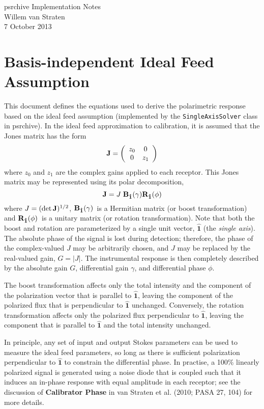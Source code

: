\documentclass[12pt]{article}
\newcommand{\boost}[1][1]{{\ensuremath{ {\bf B}_{\bm{\hat {#1}}}(\gamma) }}}
\newcommand{\rotat}[1][1]{{\ensuremath{ {\bf R}_{\bm{\hat {#1}}}(\phi) }}}
\begin{document}
\noindent
\large
{\sc psrchive} Implementation Notes \\ [2mm]
\normalsize
Willem van Straten \\
7 October 2013

\section*{Basis-independent Ideal Feed Assumption}

This document defines the equations used to derive the
polarimetric response based on the ideal feed assumption
(implemented by the {\tt SingleAxisSolver} class
in {\sc psrchive}).
%
In the ideal feed approximation to calibration, it is assumed that the
Jones matrix has the form
%
\[
{\bf J}=\left( \begin{array}{cc}
z_0 & 0 \\
0 & z_1
\end{array}\right)
\]
%
where $z_0$ and $z_1$ are the complex gains applied to each receptor.
%
This Jones matrix may be represented using its polar decomposition,
\[
{\bf J} = J \; \boost \rotat
\]
where $J=(\det{\bf J})^{1/2}$, \boost\ is a Hermitian matrix (or boost
transformation) and \rotat\ is a unitary matrix (or rotation
transformation).  Note that both the boost and rotation are parameterized
by a single unit vector, $\bm{\hat 1}$ (the {\it single axis}). 
%
The absolute phase of the signal is lost during detection; therefore,
the phase of the complex-valued $J$ may be arbitrarily chosen, and $J$
may be replaced by the real-valued gain, $G=|J|$.  The instrumental
response is then completely described by the absolute gain $G$,
differential gain $\gamma$, and differential phase $\phi$.

The boost transformation affects only the total intensity and the
component of the polarization vector that is parallel to $\bm{\hat 1}$,
leaving the component of the polarized flux that is perpendicular to
$\bm{\hat 1}$ unchanged.  Conversely, the rotation transformation
affects only the polarized flux perpendicular to $\bm{\hat 1}$, leaving
the component that is parallel to $\bm{\hat 1}$ and the total intensity
unchanged.

In principle, any set of input and output Stokes parameters can be
used to measure the ideal feed parameters, so long as there is
sufficient polarization perpendicular to $\bm{\hat 1}$ to constrain
the differential phase.  In practise, a 100\% linearly polarized signal is
generated using a noise diode that is coupled such that it induces an
in-phase response with equal amplitude in each receptor; see the
discussion of {\bf Calibrator Phase} in van Straten et al. (2010; PASA
27, 104) for more details.
\end{document}
